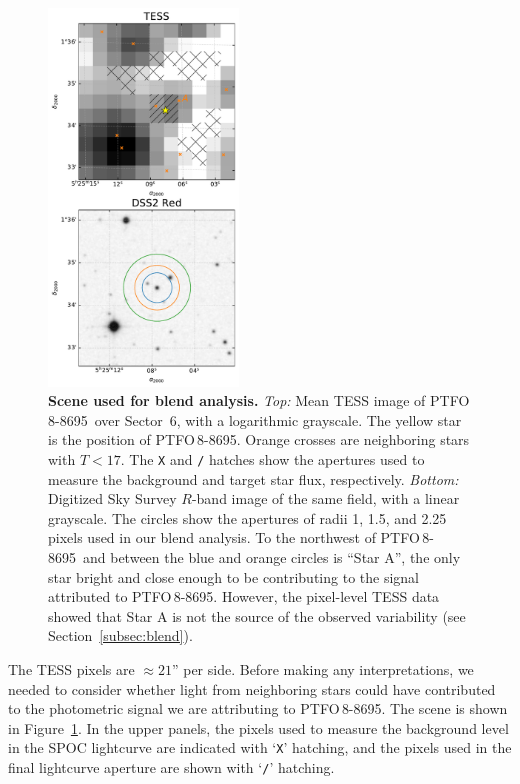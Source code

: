 \documentclass[12pt,twocolumn,tighten]{aastex62}
\newcommand{\ptfo}{PTFO$\,$8-8695}
\begin{document}
\begin{figure}[t]
	\begin{center}
		\leavevmode
		\includegraphics[width=0.45\textwidth]{f4.pdf}
	\end{center}
	\vspace{-0.7cm}
	\caption{ {\bf Scene used for blend analysis.}
    {\it Top:} Mean TESS image of \ptfo\ over Sector~6, with a
    logarithmic grayscale. The yellow star is the position of \ptfo.
    Orange crosses are neighboring stars with $T<17$. The \texttt{X}
    and \texttt{/} hatches show the apertures used to measure the
    background and target star flux, respectively.  {\it Bottom:}
    Digitized Sky Survey $R$-band image of the same field, with a
    linear grayscale. The circles show the apertures of radii 1, 1.5,
    and 2.25 pixels used in our blend analysis. To the northwest of
    \ptfo\ and between the blue and orange circles is ``Star A'', the
    only star bright and close enough to be contributing to the signal
    attributed to \ptfo. However, the pixel-level TESS data showed
    that Star A is not the source of the observed variability (see
    Section~\ref{subsec:blend}).
		\label{fig:scene}
	}
\end{figure}

The TESS pixels are $\approx21$'' per side. Before making any
interpretations, we needed to consider whether light from neighboring
stars could have contributed to the photometric signal we are
attributing to \ptfo. The scene is shown in Figure~\ref{fig:scene}.
In the upper panels, the pixels used to measure the background level
in the SPOC lightcurve are indicated with `\texttt{X}' hatching, and
the pixels used in the final lightcurve aperture are shown with
`\texttt{/}' hatching.
\end{document}
